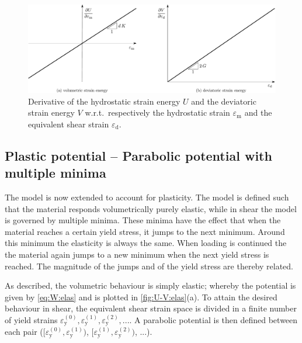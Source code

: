 \documentclass[fleqn]{goose-article}
\begin{document}
\begin{figure}[htp]
    \centering
    \includegraphics[width=1.\textwidth]{figures/potential_dU-dV_elas}
    \caption{
        Derivative of the hydrostatic strain energy $U$ and the deviatoric strain energy $V$
        w.r.t.\ respectively the hydrostatic strain $\varepsilon_\mathrm{m}$ and
        the equivalent shear strain $\varepsilon_\mathrm{d}$.}
    \label{fig:dU-dV:elas}
\end{figure}

\subsection{Plastic potential -- Parabolic potential with multiple minima}

The model is now extended to account for plasticity.
The model is defined such that the material responds volumetrically purely elastic,
while in shear the model is governed by multiple minima.
These minima have the effect that when the material reaches a certain yield stress,
it jumps to the next minimum.
Around this minimum the elasticity is always the same.
When loading is continued the the material again jumps to a new minimum
when the next yield stress is reached.
The magnitude of the jumps and of the yield stress are thereby related.

As described, the volumetric behaviour is simply elastic; whereby the potential is given by
\cref{eq:W:elas} and is plotted in \cref{fig:U-V:elas}(a).
To attain the desired behaviour in shear, the equivalent shear strain space is divided in a
finite number of yield strains $\varepsilon_\mathrm{y}^{(0)},
\varepsilon_\mathrm{y}^{(1)}, \varepsilon_\mathrm{y}^{(2)}, ...$.
A parabolic potential is then defined between each pair
($[ \varepsilon_\mathrm{y}^{(0)}, \varepsilon_\mathrm{y}^{(1)} )$,
 $[ \varepsilon_\mathrm{y}^{(1)}, \varepsilon_\mathrm{y}^{(2)} )$, ...).
\end{document}
